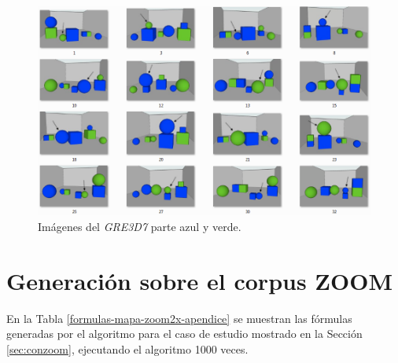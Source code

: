 \begin{figure}[h]
\centering
\includegraphics[width=1\textwidth]{images/corpusVerdeAzul.png}
\caption{Im\'agenes del \textit{GRE3D7} parte azul y verde.}
\label{verde-azul}
\end{figure}


\section{Generaci\'on sobre el corpus ZOOM} \label{er-mapa-zoom}

En la Tabla \ref{formulas-mapa-zoom2x-apendice} se muestran las f\'ormulas generadas por el algoritmo para el caso de estudio mostrado en la Secci\'on \ref{sec:conzoom}, ejecutando el algoritmo 1000 veces.

